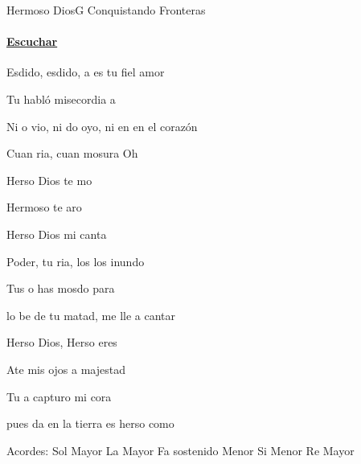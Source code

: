\documentclass[12pt, spanish]{book}
\begin{document}
    \begin{song}{Hermoso Dios}{G}
    {} %
    {Conquistando Fronteras}
    {} %
    {}
        \ifChordBk
         \paragraph{\mbox{}\hfill\protect\href{https://open.spotify.com/intl-es/track/17HZrtMgMpmyYsRA1pyVyD}{Escuchar}\mbox{}\hfill}
        \fi


        \begin{SBOpGroup}
            Esdido, esdido, a es tu fiel amor

            Tu  habló misecordia a 

            Ni o vio, ni do oyo, ni en en el corazón

            Cuan ria, cuan mosura Oh 
        \end{SBOpGroup}

        \begin{SBChorus}
            Herso Dios te mo

            Hermoso  te aro

            Herso Dios mi  canta
        \end{SBChorus}

        \begin{SBOpGroup}
             Poder, tu ria, los los inundo

            Tus o has mosdo para 

            lo be de tu matad, me lle a cantar

            Herso Dios, Herso eres 
        \end{SBOpGroup}

        \begin{SBOpGroup}
            Ate mis ojos a  majestad

            Tu a capturo mi cora

            pues da en la tierra es herso como 
        \end{SBOpGroup}

        \ifChordBk
        \begin{SBOpGroup}
            Acordes:
            \upchord{\G}\qquad Sol Mayor \hfill
            \upchord{\A}\qquad La Mayor \hfill\null\break
            \upchord{\Fsm}\qquad Fa sostenido Menor \hfill
            \upchord{\Bm}\qquad Si Menor \hfill\null\break
            \upchord{\D}\qquad Re Mayor \hfill\null\break
        \end{SBOpGroup}
        \fi
    \end{song}
\end{document}

